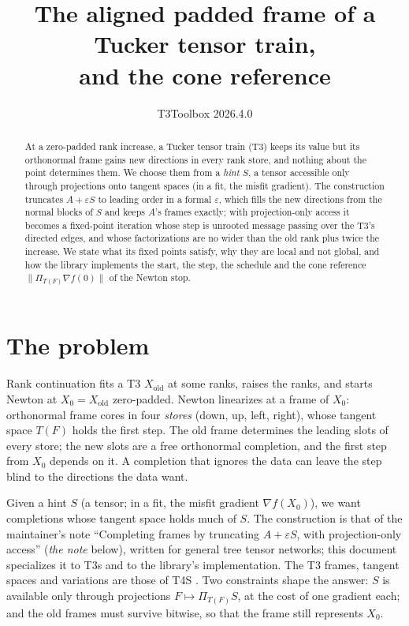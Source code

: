 \documentclass[11pt]{article}
\title{The aligned padded frame of a Tucker tensor train,\\ and the cone reference}
\author{T3Toolbox 2026.4.0}
\date{}
\newcommand{\eps}{\varepsilon}
\theoremstyle{definition}
\theoremstyle{plain}
\begin{document}
\maketitle

\begin{abstract}
At a zero-padded rank increase, a Tucker tensor train (T3) keeps its value but its orthonormal frame gains new
directions in every rank store, and nothing about the point determines them. We choose them from a \emph{hint} $S$,
a tensor accessible only through projections onto tangent spaces (in a fit, the misfit gradient). The construction
truncates $A+\eps S$ to leading order in a formal $\eps$, which fills the new directions from the normal blocks of
$S$ and keeps $A$'s frames exactly; with projection-only access it becomes a fixed-point iteration whose step is
unrooted message passing over the T3's directed edges, and whose factorizations are no wider than the old rank plus
twice the increase. We state what its fixed points satisfy, why they are local and not global, and how the library
implements the start, the step, the schedule and the cone reference $\|\Pi_{T(F)} \nabla f(0)\|$ of the Newton stop.
\end{abstract}

\tableofcontents

\section{The problem}\label{sec:problem}

Rank continuation fits a T3 $X_{\mathrm{old}}$ at some ranks, raises the ranks, and starts Newton at
$X_0 = X_{\mathrm{old}}$ zero-padded. Newton linearizes at a frame of $X_0$: orthonormal frame cores in four
\emph{stores} (down, up, left, right), whose tangent space $T(F)$ holds the first step. The old frame determines
the leading slots of every store; the new slots are a free orthonormal completion, and the first step from $X_0$
depends on it. A completion that ignores the data can leave the step blind to the directions the data want.

Given a hint $S$ (a tensor; in a fit, the misfit gradient $\nabla f(X_0)$), we want completions whose tangent space
holds much of $S$. The construction is that of the maintainer's note ``Completing frames by truncating $A+\eps S$, with
projection-only access'' \cite{AlgerNote} (\emph{the note} below), written for general tree tensor networks; this
document specializes it to T3s and to the library's implementation. The T3 frames, tangent spaces and variations are
those of T4S \cite{T4S}. Two constraints shape the answer: $S$ is available only through projections
$F\mapsto\Pi_{T(F)}S$, at the cost of one gradient each; and the old frames must survive bitwise, so that the frame
still represents $X_0$.
\end{document}
